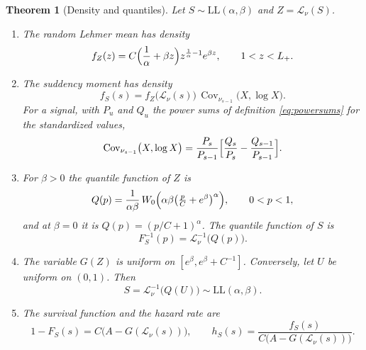 \documentclass[sn-mathphys-num]{sn-jnl}\newcommand{\SNJNL}{}
\theoremstyle{thmstyleone}
\newtheorem{theorem}{Theorem}
\theoremstyle{thmstyletwo}
\theoremstyle{thmstylethree}
\theoremstyle{thmstyleone}
\providecommand{\Cov}{\operatorname{Cov}}
\providecommand{\Leh}{\mathscr{L}}
\providecommand{\LL}{\mathrm{LL}}
\begin{document}
	\begin{theorem}[Density and quantiles]
		\label{thm:basic}
		Let $S\sim\LL(\alpha,\beta)$ and $Z=\Leh_\nu(S)$.
		\begin{enumerate}[label=\textup{(\roman*)},leftmargin=2.2em]
			\item The random Lehmer mean has density
			\begin{equation}\label{eq:lgdensity}
				f_Z(z)=C\Bigl(\frac1\alpha+\beta z\Bigr)z^{\frac1\alpha-1}e^{\beta z},
				\qquad 1<z<L_+ .
			\end{equation}
			\item The suddency moment has density
			\begin{equation}\label{eq:ll}
				f_S(s)=f_Z\bigl(\Leh_\nu(s)\bigr)\,\Cov_{\nu_{s-1}}\bigl(X,\log X\bigr).
			\end{equation}
			For a signal, with $P_u$ and $Q_u$ the power sums of
			definition \eqref{eq:powersums} for the standardized values,
			\begin{equation}\label{eq:llpower}
				\Cov_{\nu_{s-1}}\bigl(X,\log X\bigr)
				=\frac{P_s}{P_{s-1}}\Bigl[\frac{Q_s}{P_s}-\frac{Q_{s-1}}{P_{s-1}}\Bigr].
			\end{equation}
			\item For $\beta>0$ the quantile function of $Z$ is
			\begin{equation}\label{eq:Qquantile}
				Q(p)=\frac{1}{\alpha\beta}\,
				W_0\Bigl(\alpha\beta\bigl(\tfrac{p}{C}+e^{\beta}\bigr)^{\alpha}\Bigr),
				\qquad 0<p<1 ,
			\end{equation}
			and at $\beta=0$ it is $Q(p)=(p/C+1)^{\alpha}$.
			The quantile function of $S$ is
			\begin{equation}\label{eq:quantile}
				F_S^{-1}(p)=\Leh_\nu^{-1}\bigl(Q(p)\bigr).
			\end{equation}
			\item The variable $G(Z)$ is uniform on $[e^{\beta},e^{\beta}+C^{-1}]$.
			Conversely, let $U$ be uniform on $(0,1)$. Then
			\begin{equation}\label{eq:sampling}
				S=\Leh_\nu^{-1}\bigl(Q(U)\bigr)\sim\LL(\alpha,\beta).
			\end{equation}
			\item The survival function and the hazard rate are
			\begin{equation}\label{eq:survival}
				1-F_S(s)=C\bigl(A-G(\Leh_\nu(s))\bigr),
				\qquad
				h_S(s)=\frac{f_S(s)}{C\bigl(A-G(\Leh_\nu(s))\bigr)} .
			\end{equation}
		\end{enumerate}
	\end{theorem}
	
\end{document}
